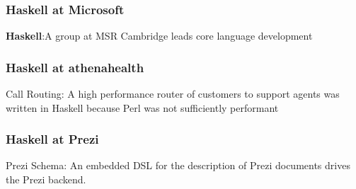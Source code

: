 
\begin{frame}
\frametitle{Haskell at Microsoft}

{\bf Haskell}:A group at MSR Cambridge leads core language development

\end{frame}


\begin{frame}
\frametitle{Haskell at athenahealth}

{Call Routing}: A high performance router of customers to support agents was
                written in Haskell because Perl was not sufficiently performant

\end{frame}



\begin{frame}
\frametitle{Haskell at Prezi}

{Prezi Schema}: An embedded DSL for the description of Prezi documents drives the
                Prezi backend.

\end{frame}


